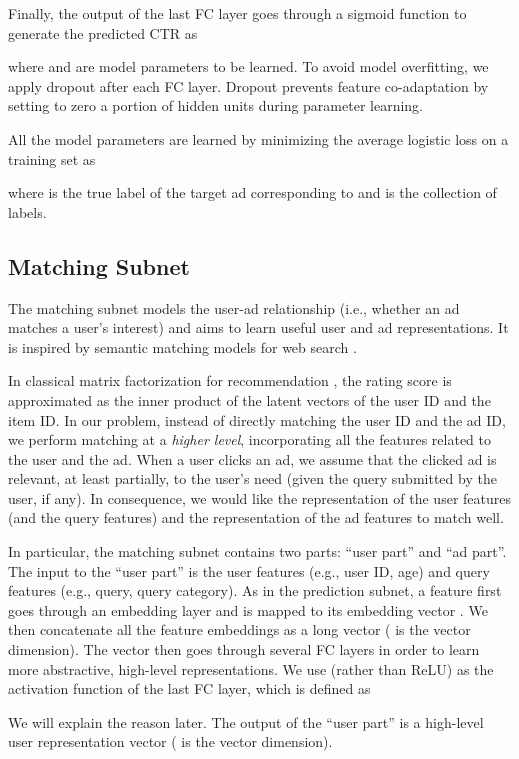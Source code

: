 \documentclass{article}
\begin{document}
Finally, the output  of the last FC layer goes through a sigmoid function to generate the predicted CTR as

where  and  are model parameters to be learned.
To avoid model overfitting, we apply dropout \cite{srivastava2014dropout} after each FC layer.
Dropout prevents feature co-adaptation by setting to zero a portion of hidden units during parameter learning.

All the model parameters are learned by minimizing the average logistic loss on a training set as

where  is the true label of the target ad corresponding to  and  is the collection of labels.

\subsection{Matching Subnet}
The matching subnet models the user-ad relationship (i.e., whether an ad matches a user's interest) and aims to learn useful user and ad representations. It is inspired by semantic matching models for web search \cite{huang2013learning}.

In classical matrix factorization for recommendation \cite{koren2009matrix}, the rating score is approximated as the inner product of the latent vectors of the user ID and the item ID.
In our problem, instead of directly matching the user ID and the ad ID, we perform matching at a \emph{higher level}, incorporating all the features related to the user and the ad.
When a user clicks an ad, we assume that the clicked ad is relevant, at least partially, to the user's need (given the query submitted by the user, if any).
In consequence, we would like the representation of the user features (and the query features) and the representation of the ad features to match well.

In particular, the matching subnet contains two parts: ``user part'' and ``ad part''.
The input to the ``user part'' is the user features (e.g., user ID, age) and query features (e.g., query, query category).
As in the prediction subnet, a feature  first goes through an embedding layer and is mapped to its embedding vector .
We then concatenate all the feature embeddings as a long vector  ( is the vector dimension).
The vector  then goes through several FC layers in order to learn more abstractive, high-level representations. We use  (rather than ReLU) as the activation function of the last FC layer, which is defined as

We will explain the reason later.
The output of the ``user part'' is a high-level user representation vector  ( is the vector dimension).
\end{document}
